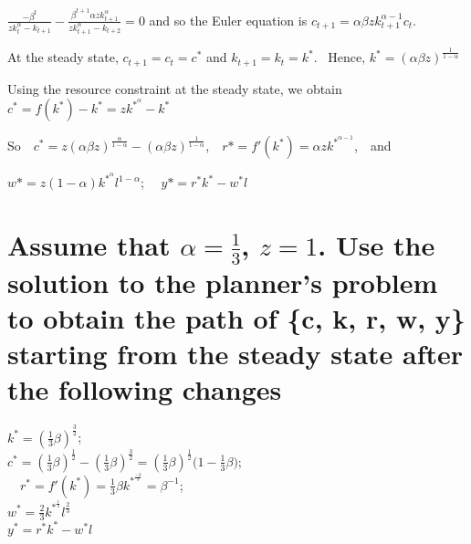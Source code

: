 \documentclass[12pt,a4paper]{article}
\begin{document}
$\frac{-\beta^{t}}{zk^{\alpha}_{t}-k_{t+1}}-\frac{\beta^{t+1} \alpha zk^{\alpha}_{t+1}}{zk^{\alpha}_{t+1}-k_{t+2}}=0$  and so the Euler equation is $c_{t+1}=\alpha \beta z k_{t+1}^{\alpha-1} c_{t}$.

At the steady state, $c_{t+1}=c_{t}=c^*$ and $k_{t+1}=k_{t}=k^*$. ~Hence, $k^*=(\alpha \beta z)^{\frac{1}{1-\alpha}}$

Using the resource constraint at the steady state, we obtain $c^*=f(k^*)-k^*=zk^{*^{\alpha}}-k^*$ 

So~~$c^*=z(\alpha \beta z)^{\frac{\alpha}{1-\alpha}}-(\alpha \beta z)^{\frac{1}{1-\alpha}}$,~~$r*=f'(k^*)=\alpha zk^{*^{\alpha-1}}$,~~and

$w*=z(1-\alpha)k^{*^{\alpha}}l^{1-\alpha}$; ~~$y*=r^*k^*-w^{*}l$

\section{ Assume that  $\alpha=\frac{1}{3}$, $z = 1$. Use the solution to the planner’s problem to obtain the path of \{c, k, r, w, y\} starting from the steady state after the following changes}

$k^*=(\frac{1}{3}\beta )^{\frac{3}{2}}$;~~\\
$c^*=(\frac{1}{3}\beta )^{\frac{1}{2}}-(\frac{1}{3}\beta )^{\frac{3}{2}}=(\frac{1}{3}\beta )^{\frac{1}{2}}\big(1-\frac{1}{3}\beta\big)$;\\ ~~$r^*=f'(k^*)=\frac{1}{3}\beta k^{*^{\frac{-2}{3}}}=\beta^{-1}$;  \\
$w^*=\frac{2}{3}k^{*^{\frac{1}{3}}}l^{\frac{2}{3}}$\\
$y^*=r^*k^*-w^{*}l$
\end{document}
